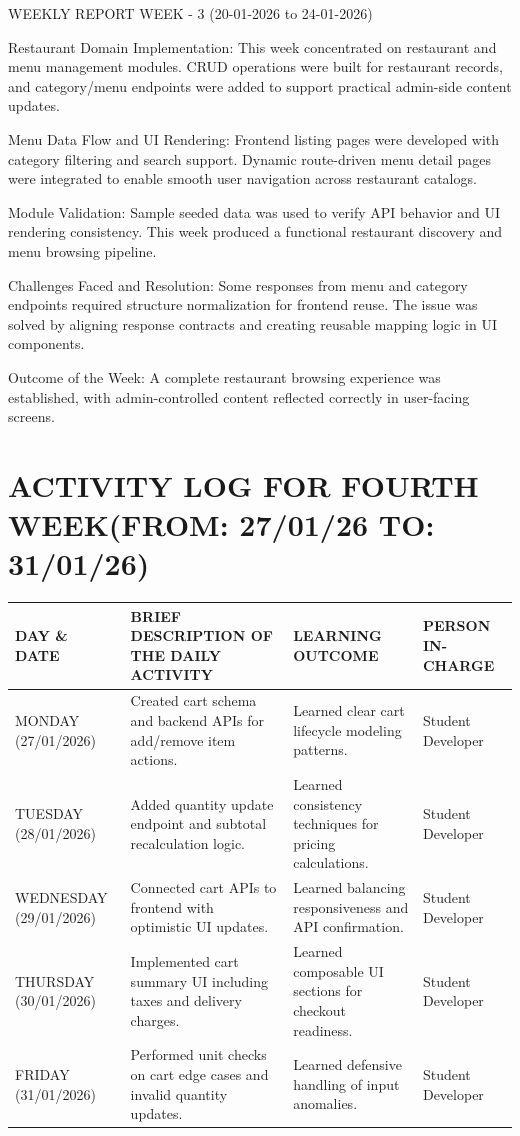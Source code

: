 \documentclass[12pt,a4paper]{report}
\begin{document}
WEEKLY REPORT
WEEK - 3 (20-01-2026 to 24-01-2026)

Restaurant Domain Implementation:
This week concentrated on restaurant and menu management modules. CRUD operations were built for restaurant records, and category/menu endpoints were added to support practical admin-side content updates.

Menu Data Flow and UI Rendering:
Frontend listing pages were developed with category filtering and search support. Dynamic route-driven menu detail pages were integrated to enable smooth user navigation across restaurant catalogs.

Module Validation:
Sample seeded data was used to verify API behavior and UI rendering consistency. This week produced a functional restaurant discovery and menu browsing pipeline.

Challenges Faced and Resolution:
Some responses from menu and category endpoints required structure normalization for frontend reuse. The issue was solved by aligning response contracts and creating reusable mapping logic in UI components.

Outcome of the Week:
A complete restaurant browsing experience was established, with admin-controlled content reflected correctly in user-facing screens.

\section*{ACTIVITY LOG FOR FOURTH WEEK(FROM: 27/01/26 TO: 31/01/26)}
\begin{longtable}{|p{2.2cm}|p{5.2cm}|p{4.3cm}|p{3.2cm}|}
\hline
\textbf{DAY \& DATE} & \textbf{BRIEF DESCRIPTION OF THE DAILY ACTIVITY} & \textbf{LEARNING OUTCOME} & \textbf{PERSON IN- CHARGE} \\
\hline
MONDAY (27/01/2026) & Created cart schema and backend APIs for add/remove item actions. & Learned clear cart lifecycle modeling patterns. & Student Developer \\
\hline
TUESDAY (28/01/2026) & Added quantity update endpoint and subtotal recalculation logic. & Learned consistency techniques for pricing calculations. & Student Developer \\
\hline
WEDNESDAY (29/01/2026) & Connected cart APIs to frontend with optimistic UI updates. & Learned balancing responsiveness and API confirmation. & Student Developer \\
\hline
THURSDAY (30/01/2026) & Implemented cart summary UI including taxes and delivery charges. & Learned composable UI sections for checkout readiness. & Student Developer \\
\hline
FRIDAY (31/01/2026) & Performed unit checks on cart edge cases and invalid quantity updates. & Learned defensive handling of input anomalies. & Student Developer \\
\hline
\end{longtable}
\end{document}
